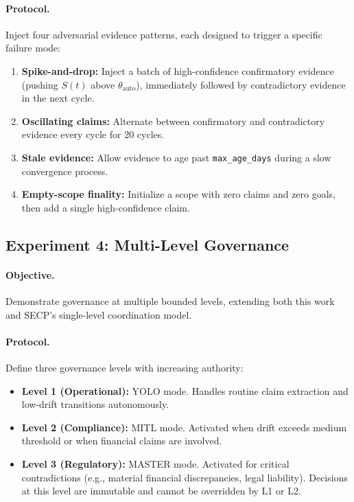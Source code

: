 \documentclass[11pt]{article}
\begin{document}
\paragraph{Protocol.} Inject four adversarial evidence patterns, each designed to trigger a specific failure mode:
\begin{enumerate}
  \item \textbf{Spike-and-drop:} Inject a batch of high-confidence confirmatory evidence (pushing $S(t)$ above $\theta_{\text{auto}}$), immediately followed by contradictory evidence in the next cycle.
  \item \textbf{Oscillating claims:} Alternate between confirmatory and contradictory evidence every cycle for 20 cycles.
  \item \textbf{Stale evidence:} Allow evidence to age past \texttt{max\_age\_days} during a slow convergence process.
  \item \textbf{Empty-scope finality:} Initialize a scope with zero claims and zero goals, then add a single high-confidence claim.
\end{enumerate}

\subsection{Experiment 4: Multi-Level Governance}

\paragraph{Objective.} Demonstrate governance at multiple bounded levels, extending both this work and SECP's single-level coordination model.

\paragraph{Protocol.} Define three governance levels with increasing authority:
\begin{itemize}
  \item \textbf{Level 1 (Operational):} YOLO mode. Handles routine claim extraction and low-drift transitions autonomously.
  \item \textbf{Level 2 (Compliance):} MITL mode. Activated when drift exceeds medium threshold or when financial claims are involved.
  \item \textbf{Level 3 (Regulatory):} MASTER mode. Activated for critical contradictions (e.g., material financial discrepancies, legal liability). Decisions at this level are immutable and cannot be overridden by L1 or L2.
\end{itemize}
\end{document}
